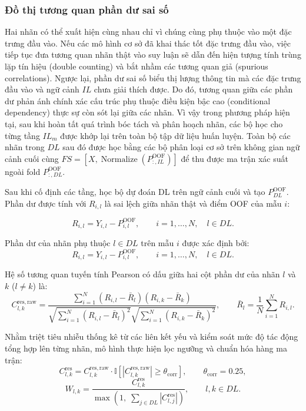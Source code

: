 \documentclass[11pt,a4paper]{article}
\begin{document}
\subsubsection{Đồ thị tương quan phần dư sai số}
Hai nhãn có thể xuất hiện cùng nhau chỉ vì chúng cùng phụ thuộc vào một đặc trưng đầu vào. Nếu các mô hình cơ sở đã khai thác tốt đặc trưng đầu vào, việc tiếp tục đưa tương quan nhãn thật vào suy luận sẽ dẫn đến hiện tượng tính trùng lặp tín hiệu (double counting) và bắt nhầm các tương quan giả (spurious correlations). Ngược lại, phần dư sai số biểu thị lượng thông tin mà các đặc trưng đầu vào và ngữ cảnh \(IL\) chưa giải thích được. Do đó, tương quan giữa các phần dư phản ánh chính xác cấu trúc phụ thuộc điều kiện bậc cao (conditional dependency) thực sự còn sót lại giữa các nhãn. Vì vậy trong phương pháp hiện tại, sau khi hoàn tất quá trình bóc tách và phân hoạch nhãn, các bộ học cho từng tầng \(IL_m\) được khớp lại trên toàn bộ tập dữ liệu huấn luyện. Toàn bộ các nhãn trong \(DL\) sau đó được học bằng các bộ phân loại cơ sở trên không gian ngữ cảnh cuối cùng \(FS = [X, \operatorname{Normalize}(P^{\mathrm{OOF}}_{:,IL})]\) để thu được ma trận xác suất ngoài fold \(P^{\mathrm{OOF}}_{:,DL}\).

Sau khi cố định các tầng, học bộ dự đoán DL trên ngữ cảnh cuối và tạo \(P^{\mathrm{OOF}}_{DL}\). Phần dư được tính với \(R_{i,l}\) là sai lệch giữa nhãn thật và điểm OOF của mẫu \(i\):

\begin{equation}
R_{i,l}=Y_{i,l}-P^{\mathrm{OOF}}_{i,l},
\qquad i=1,\ldots,N,\quad l\in DL.
\end{equation}

Phần dư của nhãn phụ thuộc \(l \in DL\) trên mẫu \(i\) được xác định bởi:
\begin{equation}
R_{i,l} = Y_{i,l} - P^{\mathrm{OOF}}_{i,l}, \qquad i=1,\ldots,N, \quad l \in DL.
\label{eq:residual}
\end{equation}

Hệ số tương quan tuyến tính Pearson có dấu giữa hai cột phần dư của nhãn \(l\) và \(k\) (\(l \ne k\)) là:
\begin{equation}
C_{l,k}^{\mathrm{res,raw}} = \frac{\sum_{i=1}^{N}(R_{i,l}-\bar R_l)(R_{i,k}-\bar R_k)}{\sqrt{\sum_{i=1}^{N}(R_{i,l}-\bar R_l)^2}\sqrt{\sum_{i=1}^{N}(R_{i,k}-\bar R_k)^2}}, \qquad \bar R_l = \frac{1}{N}\sum_{i=1}^{N}R_{i,l}.
\label{eq:pearson}
\end{equation}

Nhằm triệt tiêu nhiễu thống kê từ các liên kết yếu và kiểm soát mức độ tác động tổng hợp lên từng nhãn, mô hình thực hiện lọc ngưỡng và chuẩn hóa hàng ma trận:
\begin{equation}
C_{l,k}^{\mathrm{res}} = C_{l,k}^{\mathrm{res,raw}} \cdot \mathbb I\left[\left|C_{l,k}^{\mathrm{res,raw}}\right| \ge \theta_{\mathrm{corr}}\right], \qquad \theta_{\mathrm{corr}} = 0.25,
\label{eq:filter}
\end{equation}
\begin{equation}
W_{l,k} = \frac{C_{l,k}^{\mathrm{res}}}{\max\left(1, \; \sum_{j \in DL}\left|C_{l,j}^{\mathrm{res}}\right|\right)}, \qquad l, k \in DL.
\label{eq:weight-matrix}
\end{equation}
\end{document}
